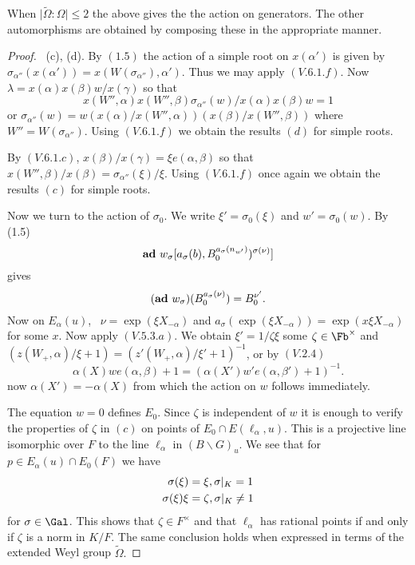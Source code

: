 \documentclass{memo-l}
\theoremstyle{definition}
\theoremstyle{remark}
\numberwithin{section}{chapter}
\numberwithin{equation}{chapter}
\begin{document}
\medskip

When $\vert\tilde\Omega:\Omega\vert\le2$ the above gives the the action
on generators.  The other automorphisms are obtained by composing these
in the appropriate manner.

\begin{proof} \ (c), (d).  By $(1.5)$ the action of a simple root on
$x({\alpha}')$ is given by ${\sigma}_{{\alpha}''}(x({\alpha}'))  =
x(W({\sigma}_{{\alpha}''}),{\alpha}')$.  Thus we may apply $(V.6.1.f)$.  Now
${\lambda}  =  x({\alpha})x({\beta})w/x({\gamma})$ so that
$$
x(W'',{\alpha})x(W'',{\beta}){\sigma}_{{\alpha}''}(w)/x({\alpha})x({\beta})w  =
1
$$
or ${\sigma}_{{\alpha}''}(w)  =
w(x({\alpha})/x(W'',{\alpha}))(x({\beta})/x(W'',{\beta}))$ where $W''  =
W({\sigma}_{{\alpha}''})$.  Using $(V.6.1.f)$ we obtain the results $(d)$
for simple roots.

   By $(V.6.1.c)$, $x({\beta})/x({\gamma})  =  {\xi}e({\alpha},{\beta})$ so
that $x(W'',{\beta})/x({\beta})  =  {\sigma}_{{\alpha}''}({\xi})/{\xi}$.  Using
$(V.6.1.f)$ once again we obtain the results $(c)$ for simple roots.

   Now we turn to the action of ${\sigma}_{0}$.  We write ${\xi}'  =
{\sigma}_{0}({\xi})$ and $w'  =  {\sigma}_{0}(w)$.  By (1.5)
$${\bold{ad}}\ w_{{\sigma}}[a_{{\sigma}}(b), B_{0}^{a_{{\sigma}}(n_{w'})})^{{\sigma}({\nu})}]$$
gives
$$
({\bold {ad}}\ w_{{\sigma}})(B_{0}^{a_{{\sigma}}({\nu})})  =  B_{0}^{\nu'}.
$$
Now on $E_{{\alpha}}(u)$, \  $\nu  =  \exp({\xi}X_{-{\alpha}})$ and
$a_{{\sigma}}(\exp({\xi}X_{-{\alpha}}))  =  \exp(x{\xi}X_{-{\alpha}})$ for some
$x$.  Now apply $(V.5.3.a)$.  We obtain ${\xi}'  =  1/{\zeta}{\xi}$ some
${\zeta}  \in  \Fb^{\times}$ and $(z(W_{+},{\alpha})/{\xi} + 1)  =
(z'(W_{+},{\alpha})/{\xi}' + 1)^{-1}$, or by $(V.2.4)$
$$
{\alpha}(X)we({\alpha},{\beta}) + 1  =
({\alpha}(X')w'e({\alpha},{\beta}')+1)^{-1}.
$$
now ${\alpha}(X')  =  -{\alpha}(X)$ from which the action on $w$ follows
immediately.

   The equation $w = 0$ defines $E_{0}$.  Since ${\zeta}$ is independent of
$w$ it is enough to verify the properties of ${\zeta}$ in $(c)$ on points
of $E_{0}  \cap  E({\ell}_{{\alpha}},u)$.  This is a projective line
isomorphic over $F$ to the line ${\ell}_{{\alpha}}$ in $(B\backslash
G)_{u}$.  We see that for $p  \in  E_{{\alpha}}(u)  \cap  E_{0}(F)$ we have
$$
\aligned
{\sigma}({\xi})  &=  {\xi}, {\sigma}\vert _{K}  =  1 \\
{\sigma}({\xi}){\xi}  &=  {\zeta}, {\sigma}\vert _{K}  \ne 1
\endaligned
$$
for ${\sigma}  \in  \Gal$.  This shows that ${\zeta}  \in  F^{\times}$
and that ${\ell}_{{\alpha}}$ has rational points if and only if ${\zeta}$
is a norm in $K/F$.  The same conclusion holds when expressed in terms of
the extended Weyl group $\tilde{\Omega}.$
\end{proof}
\end{document}
